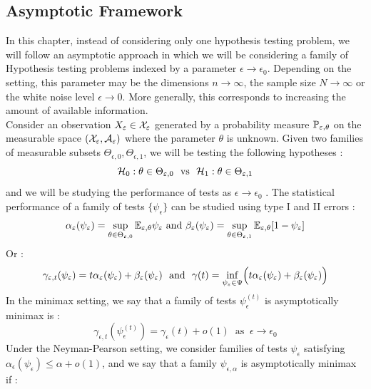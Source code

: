 \subsection{Asymptotic Framework}
In this chapter, instead of considering only one hypothesis testing problem, we will follow an asymptotic approach in which we will be considering a family of Hypothesis testing problems indexed by a parameter $\epsilon \rightarrow \epsilon_0$. 
Depending on the setting, this parameter may be the dimensions $n \rightarrow \infty$, the sample size $N \rightarrow \infty$ or the white noise level $\epsilon \rightarrow 0$. More generally, this corresponds to increasing the amount of available information.\\ 
Consider an observation $X_\epsilon \in \mx_\epsilon$ generated by a probability measure $\P_{\epsilon,\theta}$ on the measurable space $(\mx_\epsilon,\mathcal{A}_\epsilon)$ where the parameter $\theta$ is unknown. Given two families of measurable subsets $\Theta_{\epsilon,0},\Theta_{\epsilon,1}$, we will be testing the following hypotheses : 
\begin{equation}\label{hyptest}
    \H_0 : \theta \in \Theta_{\epsilon,0} \ \text{ vs } \  \H_1 : \theta \in \Theta_{\epsilon,1}
\end{equation}
and we will be studying the performance of tests as $\epsilon \rightarrow \epsilon_0$ .
The statistical performance of a family of tests $\{\psi_\epsilon\}$ can be studied using type I and II errors : \begin{equation*}
     \alpha_\epsilon(\psi_\epsilon) = \sup_{\theta \in \Theta_{\epsilon,0}}\E_{\epsilon,\theta} \psi_\epsilon \text{ and } \beta_\epsilon(\psi_\epsilon) = \sup_{\theta \in \Theta_{\epsilon,1}}\E_{\epsilon,\theta}[1-\psi_\epsilon] 
\end{equation*}
Or : \begin{equation*}
    \gamma_{\epsilon,t}(\psi_\epsilon) = t \alpha_\epsilon(\psi_\epsilon)+\beta_\epsilon(\psi_\epsilon) \ \text{ and } \ \gamma(t) = \inf_{\psi_\epsilon \in \Psi}\Bigl(t \alpha_\epsilon(\psi_\epsilon) + \beta_{\epsilon}(\psi_\epsilon)\Bigr)
\end{equation*}
In the minimax setting, we say that a family of tests $\psi_{\epsilon}^{(t)}$ is asymptotically minimax is : \begin{equation*}
    \gamma_{\epsilon,t}(\psi_{\epsilon}^{(t)}) = \gamma_\epsilon(t) + o(1) \ \text{ as } \  \epsilon \rightarrow \epsilon_0
\end{equation*}
Under the Neyman-Pearson setting, we consider families of tests $\psi_\epsilon$ satisfying $\alpha_\epsilon(\psi_\epsilon) \leq \alpha + o(1)$, and we say that a family $\psi_{\epsilon,\alpha}$ is asymptotically minimax if : 
